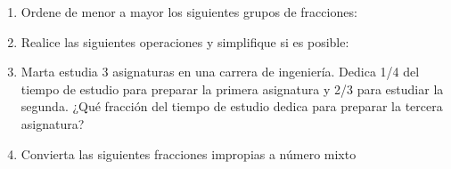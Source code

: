 \documentclass[fleqn]{article}
\begin{document}
\begin{enumerate}
\item Ordene de menor a mayor los siguientes grupos de fracciones:
\begin{enumerate}
\end{enumerate}\noanswer[.25in]
\item Realice las siguientes operaciones y simplifique si es posible:
\begin{enumerate}
\noanswer[.1in]
\noanswer[.1in]
\end{enumerate}
\item Marta estudia 3 asignaturas en una carrera de ingeniería. Dedica 1/4 del tiempo de estudio para preparar la primera asignatura y 2/3 para estudiar la segunda. ¿Qué fracción del tiempo de estudio dedica para preparar la tercera asignatura?\noanswer
\item Convierta las siguientes fracciones impropias a número mixto

\end{enumerate}
\end{document}

